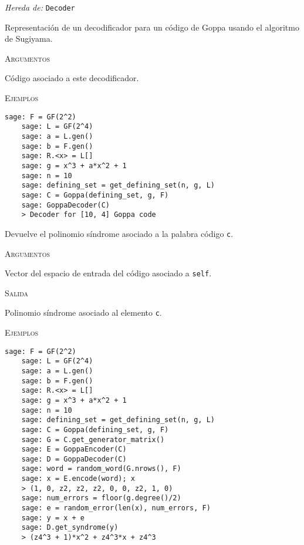 \begin{description}[leftmargin=1em, font=\normalfont\ttfamily, style=nextline]
  \item[class GoppaDecoder(self, code)]

  \emph{Hereda de:} \texttt{Decoder}

Representación de un decodificador para un código de Goppa usando el algoritmo de Sugiyama.

\textsc{Argumentos}
\begin{description}[font=\normalfont\ttfamily]
  \item[code] Código asociado a este decodificador.
\end{description}

\textsc{Ejemplos}
  \begin{lstlisting}[gobble=4]
    sage: F = GF(2^2)
    sage: L = GF(2^4)
    sage: a = L.gen()
    sage: b = F.gen()
    sage: R.<x> = L[]
    sage: g = x^3 + a*x^2 + 1
    sage: n = 10
    sage: defining_set = get_defining_set(n, g, L)
    sage: C = Goppa(defining_set, g, F)
    sage: GoppaDecoder(C)
    > Decoder for [10, 4] Goppa code
  \end{lstlisting}

\begin{description}[font=\ttfamily, style=nextline]
  \item[get\_syndrome(self, c)] Devuelve el polinomio síndrome asociado a la palabra código \texttt{c}.

  \textsc{Argumentos}
  \begin{description}[font=\normalfont\ttfamily]
      \item[c] Vector del espacio de entrada del código asociado a \texttt{self}.
  \end{description}

  \textsc{Salida}
  \begin{description}[font=\normalfont\ttfamily]
      \item[] Polinomio síndrome asociado al elemento \texttt{c}.
  \end{description}

  \textsc{Ejemplos}
  \begin{lstlisting}[gobble=4]
    sage: F = GF(2^2)
    sage: L = GF(2^4)
    sage: a = L.gen()
    sage: b = F.gen()
    sage: R.<x> = L[]
    sage: g = x^3 + a*x^2 + 1
    sage: n = 10
    sage: defining_set = get_defining_set(n, g, L)
    sage: C = Goppa(defining_set, g, F)
    sage: G = C.get_generator_matrix()
    sage: E = GoppaEncoder(C)
    sage: D = GoppaDecoder(C)
    sage: word = random_word(G.nrows(), F)
    sage: x = E.encode(word); x
    > (1, 0, z2, z2, z2, 0, 0, z2, 1, 0)
    sage: num_errors = floor(g.degree()/2)
    sage: e = random_error(len(x), num_errors, F)
    sage: y = x + e
    sage: D.get_syndrome(y)
    > (z4^3 + 1)*x^2 + z4^3*x + z4^3
  \end{lstlisting}


\end{description}
\end{description}
